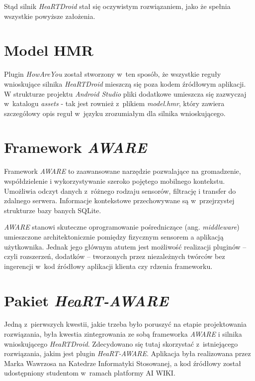 Stąd silnik \textit{HeaRTDroid} stał się oczywistym rozwiązaniem, jako że spełnia wszystkie powyższe założenia.


\section{Model HMR}
\label{sec:modelHmr}

Plugin \textit{HowAreYou} został stworzony w~ten sposób, że wszystkie reguły wnioskujące silnika \textit{HeaRTDroid} mieszczą się poza kodem źródłowym aplikacji. W strukturze projektu \textit{Android Studio} pliki dodatkowe umieszcza się zazwyczaj w~katalogu \textit{assets} - tak jest rownież z~plikiem \textit{model.hmr}, który zawiera szczegółowy opis reguł w~języku zrozumiałym dla silnika wnioskującego.


\section{Framework \textit{AWARE}}
\label{sec:frameworkAware}

Framework \textit{AWARE} to zaawansowane narzędzie pozwalające na gromadzenie, współdzielenie i wykorzystywanie szeroko pojętego mobilnego kontekstu. Umożliwia odczyt danych z~różnego rodzaju sensorów, filtrację i transfer do zdalnego serwera. Informacje kontekstowe przechowywane są w~przejrzystej strukturze bazy banych SQLite. 

\textit{AWARE} stanowi skuteczne oprogramowanie pośredniczące (ang. \textit{middleware}) umieszczone architektonicznie pomiędzy fizycznym sensorem a aplikacją użytkownika. Jednak jego głównym atutem jest możliwość realizacji pluginów -- czyli rozszerzeń, dodatków -- tworzonych przez niezależnych twórców bez ingerencji w~kod źródłowy aplikacji klienta czy rdzenia frameworku\cite{AwareFramework}. 



\section{Pakiet \textit{HeaRT-AWARE}}
\label{sec:pakietHeartAware}

Jedną z~pierwszych kwestii, jakie trzeba było poruszyć na etapie projektowania rozwiązania, była kwestia zintegrowania ze sobą frameworka \textit{AWARE} i silnika wnioskującego \textit{HeaRTDroid}. Zdecydowano się tutaj skorzystać z~istniejącego rozwiązania, jakim jest plugin \textit{HeaRT-AWARE}. Aplikacja była realizowana przez Marka Wawrzosa na Katedrze Informatyki Stosowanej, a kod źródłowy został udostępniony studentom w~ramach platformy AI WIKI\cite{heartaware}.

